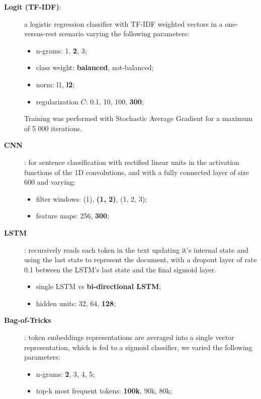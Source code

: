 \documentclass[11pt,a4paper]{article}
\begin{document}
\begin{description}

\item[\textbf{Logit (TF-IDF)}:] a logistic regression classifier with TF-IDF
weighted vectors in a one-versus-rest scenario varying the following parameters:

\begin{itemize}
\item n-grams: 1, \textbf{2}, 3;
\item class weight: \textbf{balanced}, not-balanced;
\item norm: l1, \textbf{l2};
\item regularization $C$: 0.1, 10, 100, \textbf{300};
\end{itemize}

Training was performed with Stochastic Average Gradient for a maximum of 5 000
iterations.

\item[\textbf{CNN}]\cite{kim-2014-convolutional}: for sentence classification
with rectified linear units in the activation functions of the 1D convolutions,
and with a fully connected layer of size 600 and varying:

\begin{itemize}
\item filter windows: (1), \textbf{(1, 2)}, (1, 2, 3);
\item feature maps: 256, \textbf{300};
\end{itemize}

\item[\textbf{LSTM}]\cite{Hochreiter:1997:LSM:1246443.1246450}: recursively reads
each token in the text updating it's internal state and using the last state to
represent the document, with a dropout layer of rate 0.1 between the LSTM's last
state and the final sigmoid layer.

\begin{itemize}
\item single LSTM vs \textbf{bi-directional LSTM};
\item hidden units: 32, 64, \textbf{128};
\end{itemize}

\item[\textbf{Bag-of-Tricks}]\cite{joulin-etal-2017-bag}: token embeddings
representations are averaged into a single vector representation, which is fed
to a sigmoid classifier, we varied the following parameters:

\begin{itemize}
\item n-grams: \textbf{2}, 3, 4, 5;
\item top-k most frequent tokens: \textbf{100k}, 90k, 80k;
\end{itemize}

\end{description}
\end{document}
